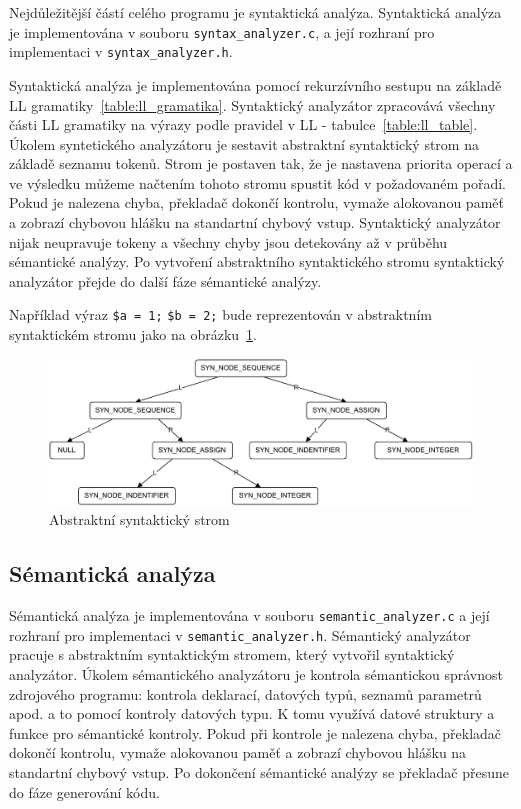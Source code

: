 \documentclass[a4paper, 12pt]{article}
\begin{document}
	Nejdůležitější částí celého programu je syntaktická analýza. Syntaktická analýza je implementována v souboru
	\texttt{syntax\_analyzer.c}, a její rozhraní pro implementaci v \texttt{syntax\_analyzer.h}.

	Syntaktická analýza je implementována pomocí rekurzívního sestupu na základě LL gramatiky~\ref{table:ll_gramatika}. Syntaktický
	analyzátor zpracovává všechny části LL gramatiky na výrazy podle pravidel v LL - tabulce~\ref{table:ll_table}. Úkolem
	syntetického analyzátoru je sestavit abstraktní syntaktický strom na základě seznamu tokenů. Strom je postaven
	tak, že je nastavena priorita operací a ve výsledku můžeme načtením tohoto stromu spustit kód v
	požadovaném pořadí. Pokud je nalezena chyba, překladač dokončí kontrolu, vymaže alokovanou paměť
	a zobrazí chybovou hlášku na standartní chybový vstup. Syntaktický analyzátor nijak neupravuje tokeny a všechny
	chyby jsou detekovány až v průběhu sémantické analýzy. Po vytvoření abstraktního syntaktického stromu
	syntaktický analyzátor přejde do další fáze sémantické analýzy.

	Například výraz \texttt{\$a = 1;} \texttt{\$b = 2;}
	bude reprezentován v abstraktním syntaktickém stromu jako na obrázku~\ref{figure:ast}.

	\begin{figure}[!ht]
		\centering
		\includegraphics[width=1\linewidth]{ast.pdf}
		\caption{Abstraktní syntaktický strom}
		\label{figure:ast}
	\end{figure}

	\subsection{Sémantická analýza}
	Sémantická analýza je implementována v souboru \texttt{semantic\_analyzer.c} a její rozhraní pro implementaci
	v \texttt{semantic\_analyzer.h}. Sémantický analyzátor pracuje s abstraktním syntaktickým stromem, který
	vytvořil syntaktický analyzátor. Úkolem sémantického analyzátoru je kontrola sémantickou správnost zdrojového
	programu: kontrola deklarací, datových typů, seznamů parametrů apod. a to pomocí kontroly datových typu. K
	tomu využívá datové struktury a funkce pro sémantické kontroly. Pokud při kontrole je nalezena chyba, překladač dokončí
	kontrolu, vymaže alokovanou paměť a zobrazí chybovou hlášku na standartní chybový vstup. Po dokončení
	sémantické analýzy se překladač přesune do fáze generování kódu.
\end{document}
